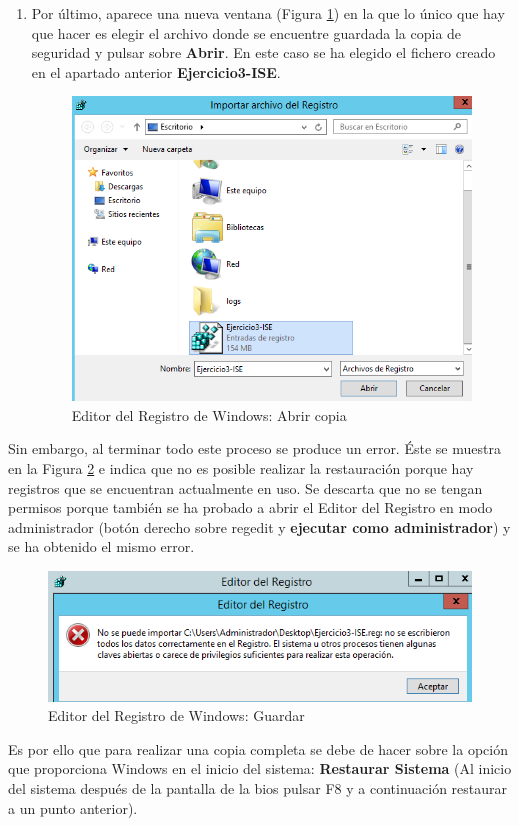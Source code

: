 \begin{enumerate}
		\item Por último, aparece una nueva ventana (Figura \ref{fig:figura3-7}) en la que lo único que hay que hacer es elegir el archivo donde se encuentre guardada la copia de seguridad y pulsar sobre \textbf{Abrir}. En este caso se ha elegido el fichero creado en el apartado anterior \textbf{Ejercicio3-ISE}.
			\begin{figure}[H] %
				\centering
				\includegraphics[scale=0.8]{figuras/ejercicio3/figura3-7.png} 
				\caption{Editor del Registro de Windows: Abrir copia} 
				\label{fig:figura3-7}
			\end{figure}		
	\end{enumerate}
	\vspace{-15pt}
	Sin embargo, al terminar todo este proceso se produce un error. Éste se muestra en la Figura \ref{fig:figura3-8} e indica que no es posible realizar la restauración porque hay registros que se encuentran actualmente en uso.
	Se descarta que no se tengan permisos porque también se ha probado a abrir el Editor del Registro en modo administrador (botón derecho sobre regedit y \textbf{ejecutar como administrador}) y se ha obtenido el mismo error.
	
	\begin{figure}[H] %
		\centering
		\includegraphics[scale=0.9]{figuras/ejercicio3/figura3-8.png} 
		\caption{Editor del Registro de Windows: Guardar} 
		\label{fig:figura3-8}
	\end{figure}
	Es por ello que para realizar una copia completa se debe de hacer sobre la opción que proporciona Windows en el inicio del sistema: \textbf{Restaurar Sistema} (Al inicio del sistema después de la pantalla de la bios pulsar F8 y a continuación restaurar a un punto anterior).
	
